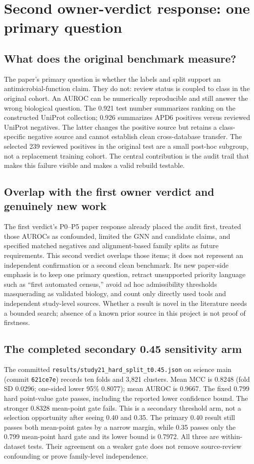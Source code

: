 \clearpage
\section*{Second owner-verdict response: one primary question}
\subsection*{What does the original benchmark measure?}
The paper's primary question is whether the labels and split support an antimicrobial-function claim. They do not: review status is coupled to class in the original cohort. An AUROC can be numerically reproducible and still answer the wrong biological question. The 0.921 test number summarizes ranking on the constructed UniProt collection; 0.926 summarizes APD6 positives versus reviewed UniProt negatives. The latter changes the positive source but retains a class-specific negative source and cannot establish clean cross-database transfer. The selected 239 reviewed positives in the original test are a small post-hoc subgroup, not a replacement training cohort. The central contribution is the audit trail that makes this failure visible and makes a valid rebuild testable.

\subsection*{Overlap with the first owner verdict and genuinely new work}
The first verdict's P0--P5 paper response already placed the audit first, treated those AUROCs as confounded, limited the GNN and candidate claims, and specified matched negatives and alignment-based family splits as future requirements. This second verdict overlaps those items; it does not represent an independent confirmation or a second clean benchmark. Its new paper-side emphasis is to keep one primary question, retract unsupported priority language such as ``first automated census,'' avoid ad hoc admissibility thresholds masquerading as validated biology, and count only directly used tools and independent study-level sources. Whether a result is novel in the literature needs a bounded search; absence of a known prior source in this project is not proof of firstness.

\subsection*{The completed secondary 0.45 sensitivity arm}
The committed \texttt{results/study21\_hard\_split\_t0.45.json} on science main (commit \texttt{621ce7e}) records ten folds and 3,821 clusters. Mean MCC is 0.8248 (fold SD 0.0296; one-sided lower 95\% 0.8077); mean AUROC is 0.9667. The fixed 0.799 hard point-value gate passes, including the reported lower confidence bound. The stronger 0.8328 mean-point gate fails. This is a secondary threshold arm, not a selection opportunity after seeing 0.40 and 0.35. The primary 0.40 result still passes both mean-point gates by a narrow margin, while 0.35 passes only the 0.799 mean-point hard gate and its lower bound is 0.7972. All three are within-dataset tests. Their agreement on a weaker gate does not remove source-review confounding or prove family-level independence.

